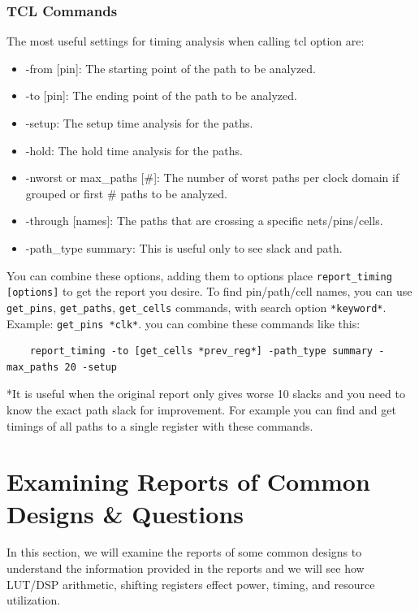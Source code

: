 \documentclass{report}
\begin{document}
\subsection{TCL Commands}
The most useful settings for timing analysis when calling tcl option are:
\begin{itemize} 
    \item -from [pin]: The starting point of the path to be analyzed.
    \item -to [pin]: The ending point of the path to be analyzed.
    \item -setup: The setup time analysis for the paths.
    \item -hold: The hold time analysis for the paths.
    \item -nworst or max\_paths [\#]: The number of worst paths per clock domain if grouped or first \# paths to be analyzed.
    \item -through [names]: The paths that are crossing a specific nets/pins/cells.
    \item -path\_type summary: This is useful only to see slack and path.
\end{itemize}

You can combine these options, adding them to options place \texttt{report\_timing [options]} to get the report you desire. 
To find pin/path/cell names, you can use \texttt{get\_pins}, \texttt{get\_paths}, \texttt{get\_cells} commands, with search option \texttt{*keyword*}. Example: \texttt{get\_pins *clk*}.
you can combine these commands like this:
\begin{verbatim}
    report_timing -to [get_cells *prev_reg*] -path_type summary -max_paths 20 -setup
\end{verbatim}
*It is useful when the original report only gives worse 10 slacks and you need to know the exact path slack for improvement. For example you can find and get timings of all paths to a single register with these commands.

\chapter{Examining Reports of Common Designs \& Questions}
In this section, we will examine the reports of some common designs to understand the information provided in the reports and we will see how LUT/DSP arithmetic, shifting registers effect power, timing, and resource utilization.

\end{document}
